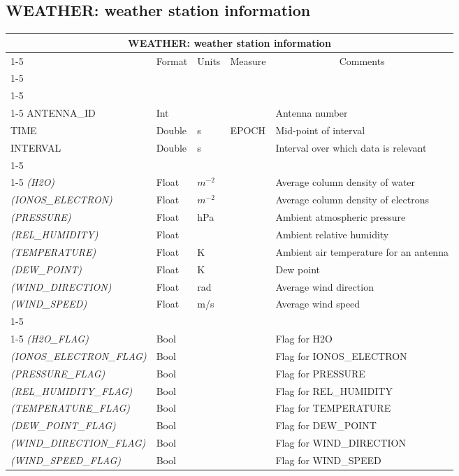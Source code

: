 \documentclass{article}
\newcommand{\defline}[1]{\cline{1-5}
\multicolumn{5}{|l|}{#1} \\
\cline{1-5}}
\newcommand{\definetable}[2]
{
	\vfill\newpage
	\subsection{#1}
        \vspace{0.15in}
        \small
	\begin{tabular}{|l|p{1.25in}|l|p{.9in}|p{1.4in}|}
	\hline
	\multicolumn{5}{|c|}{\bf #1}\\ 
	\cline{1-5}
        \multicolumn{1}{|c|}{Name}&\multicolumn{1}{|c|}{Format}&
        \multicolumn{1}{|c|}{Units}&\multicolumn{1}{|c|}{Measure}&
        \multicolumn{1}{|c|}{Comments}\\
        \cline{1-5}
        #2
        \hline
	\end{tabular}
}
\begin{document}
\definetable{WEATHER: weather station information}{
\defline{\bf Columns}
\defline{\em Key}
ANTENNA\_ID &        Int &    &      & Antenna number\\
TIME &  Double  &   s  & EPOCH  & Mid-point of interval\\ 
INTERVAL &       Double &        s  &      & Interval over which data is relevant\\
\defline{\em Data}  
{\it (H2O)} &        Float    &     $m^{-2}$  &      & Average column density of water\\
{\it (IONOS\_ELECTRON)} & Float & $m^{-2}$    &      & Average column density of electrons\\
{\it (PRESSURE)} &       Float & hPa  &      & Ambient atmospheric pressure\\
{\it (REL\_HUMIDITY)} &   Float &    &      & Ambient relative humidity\\
{\it (TEMPERATURE)} &    Float &  K  &     & Ambient air temperature for an antenna\\
{\it (DEW\_POINT)} & Float & K & & Dew point \\
{\it (WIND\_DIRECTION)} & Float  &       rad &      & Average wind direction\\
{\it (WIND\_SPEED)} &  Float &  m/s  &    & Average wind speed \\
\defline{\em Flags}
{\it (H2O\_FLAG)} & Bool & & & Flag for H2O \\
{\it (IONOS\_ELECTRON\_FLAG)} & Bool & & & Flag for IONOS\_ELECTRON \\
{\it (PRESSURE\_FLAG)} & Bool & & & Flag for PRESSURE \\
{\it (REL\_HUMIDITY\_FLAG)} & Bool & & & Flag for REL\_HUMIDITY \\
{\it (TEMPERATURE\_FLAG)} & Bool & & & Flag for TEMPERATURE \\
{\it (DEW\_POINT\_FLAG)} & Bool & & & Flag for DEW\_POINT \\
{\it (WIND\_DIRECTION\_FLAG)} & Bool & & & Flag for WIND\_DIRECTION \\
{\it (WIND\_SPEED\_FLAG)} & Bool & & & Flag for WIND\_SPEED \\
}
\end{document}

